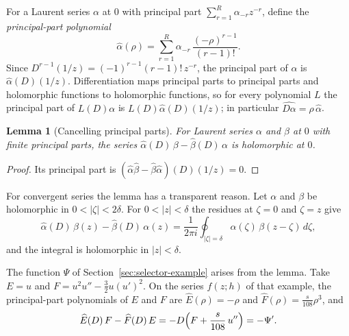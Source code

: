 \documentclass[11pt]{article}
\newtheorem{lemma}[theorem]{Lemma}
\theoremstyle{definition}
\theoremstyle{remark}
\numberwithin{equation}{section}
\newcommand{\hatt}[1]{\widehat{#1}}
\begin{document}
For a Laurent series \(\alpha\) at \(0\) with principal part
\(\sum_{r=1}^{R}\alpha_{-r}z^{-r}\), define the \emph{principal-part
polynomial}
\[
 \hatt\alpha(\rho)=\sum_{r=1}^{R}\alpha_{-r}\,\frac{(-\rho)^{r-1}}{(r-1)!} .
\]
Since \(D^{r-1}(1/z)=(-1)^{r-1}(r-1)!\,z^{-r}\), the principal part of
\(\alpha\) is \(\hatt\alpha(D)(1/z)\). Differentiation maps principal
parts to principal parts and holomorphic functions to holomorphic
functions, so for every polynomial \(L\) the principal part of
\(L(D)\alpha\) is \(L(D)\hatt\alpha(D)(1/z)\); in particular
\(\hatt{D\alpha}=\rho\,\hatt\alpha\).

\begin{lemma}[Cancelling principal parts]\label{lem:bracket}
For Laurent series \(\alpha\) and \(\beta\) at \(0\) with finite
principal parts, the series
\(\hatt\alpha(D)\,\beta-\hatt\beta(D)\,\alpha\) is holomorphic at
\(0\).
\end{lemma}

\begin{proof}
Its principal part is
\((\hatt\alpha\hatt\beta-\hatt\beta\hatt\alpha)(D)(1/z)=0\).
\end{proof}

For convergent series the lemma has a transparent reason. Let
\(\alpha\) and \(\beta\) be holomorphic in \(0<|\zeta|<2\delta\). For
\(0<|z|<\delta\) the residues at \(\zeta=0\) and \(\zeta=z\) give
\[
 \hatt\alpha(D)\,\beta(z)-\hatt\beta(D)\,\alpha(z)
 =\frac{1}{2\pi i}\oint_{|\zeta|=\delta}\alpha(\zeta)\,\beta(z-\zeta)\,d\zeta ,
\]
and the integral is holomorphic in \(|z|<\delta\).

The function \(\Psi\) of Section~\ref{sec:selector-example} arises from
the lemma. Take \(E=u\) and \(F=u^2u''-\tfrac32u(u')^2\). On the series
\(f(z;h)\) of that example, the principal-part polynomials of \(E\) and
\(F\) are \(\hatt E(\rho)=-\rho\) and
\(\hatt F(\rho)=\tfrac{s}{108}\rho^3\), and
\[
 \hatt E(D)\,F-\hatt F(D)\,E=-D\Bigl(F+\frac{s}{108}\,u''\Bigr)=-\Psi' .
\]
\end{document}
